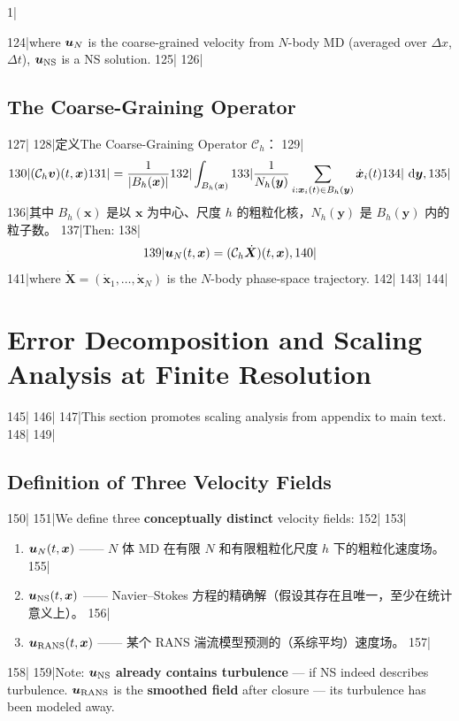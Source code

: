 1|\documentclass[11pt,a4paper]{article}
\begin{document}
124|where $\bm{u}_N$ is the coarse-grained velocity from $N$-body MD (averaged over $\Delta x$, $\Delta t$), $\bm{u}_{\text{NS}}$ is a NS solution.
125|
126|\subsection{The Coarse-Graining Operator}
127|
128|定义The Coarse-Graining Operator $\mathcal{C}_{h}$：
129|\begin{equation}\label{eq:coarse}
130|  (\mathcal{C}_{h}\bm{v})(t,\bm{x})
131|  = \frac{1}{\left\lvert B_h(\bm{x})\right\rvert}
132|   \int_{B_h(\bm{x})}
133|   \frac{1}{N_h(\bm{y})}\sum_{i: \bm{x}_i(t)\in B_h(\bm{y})} \dot{\bm{x}}_i(t)
134|   \,\,\mathrm{d}\bm{y},
135|\end{equation}
136|其中 $B_h(\bm{x})$ 是以 $\bm{x}$ 为中心、尺度 $h$ 的粗粒化核，$N_h(\bm{y})$ 是 $B_h(\bm{y})$ 内的粒子数。
137|Then:
138|\begin{equation}\label{eq:un_def}
139|  \bm{u}_N(t,\bm{x}) = (\mathcal{C}_{h}\dot{\bm{X}})(t,\bm{x}),
140|\end{equation}
141|where $\dot{\bm{X}} = (\dot{\bm{x}}_1,\dots,\dot{\bm{x}}_N)$ is the $N$-body phase-space trajectory.
142|
143|%
144|\section{Error Decomposition and Scaling Analysis at Finite Resolution}
145|%
146|
147|This section promotes scaling analysis from appendix to main text.
148|
149|\subsection{Definition of Three Velocity Fields}
150|
151|We define three \textbf{conceptually distinct} velocity fields:
152|
153|\begin{enumerate}[label=(\arabic*),leftmargin=*]
154|  \item $\bm{u}_N(t,\bm{x})$ —— $N$ 体 MD 在有限 $N$ 和有限粗粒化尺度 $h$ 下的粗粒化速度场。
155|  \item $\bm{u}_{\text{NS}}(t,\bm{x})$ —— Navier--Stokes 方程的精确解（假设其存在且唯一，至少在统计意义上）。
156|  \item $\bm{u}_{\text{RANS}}(t,\bm{x})$ —— 某个 RANS 湍流模型预测的（系综平均）速度场。
157|\end{enumerate}
158|
159|Note: $\bm{u}_{\text{NS}}$ \textbf{already contains turbulence} — if NS indeed describes turbulence. $\bm{u}_{\text{RANS}}$ is the \textbf{smoothed field} after closure — its turbulence has been modeled away.
\end{document}
